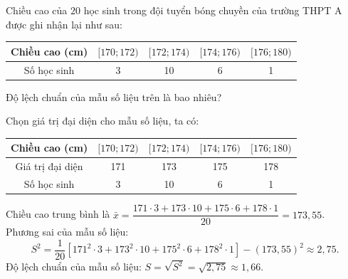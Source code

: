 \begin{bt}%

	Chiều cao của $20$ học sinh trong đội tuyển bóng chuyền của trường THPT A được ghi nhận lại như sau:
	\begin{center}
		\begin{tabular}{|c|c|c|c|c|}
			\hline Chiều cao (cm) &{$[170; 172)$} &{$[172; 174)$} &{$[174; 176)$} &{$[176; 180)$} \\
			\hline Số học sinh & 3 & 10 & 6 & 1 \\
			\hline
		\end{tabular}
	\end{center}
	Độ lệch chuẩn của mẫu số liệu trên là bao nhiêu?
	\loigiai
	{
		Chọn giá trị đại diện cho mẫu số liệu, ta có:
		\begin{center}
			\begin{tabular}{|c|c|c|c|c|}
				\hline Chiều cao (cm)  &{$[170; 172)$} &{$[172; 174)$} &{$[174; 176)$} &{$[176; 180)$} \\
				\hline Giá trị đại diện & 171 & 173 & 175 & 178 \\
				\hline Số học sinh & 3 & 10 & 6 & 1 \\
				\hline
			\end{tabular}
		\end{center} 
		Chiều cao trung bình là $\bar{x}=\dfrac{171\cdot 3+173\cdot 10+175\cdot  6+178\cdot 1 }{20}=173{,}55$.\\
		Phương sai của mẫu số liệu:
		$$
		S^2=\dfrac{1}{20}\left[171^2\cdot 3+173^2\cdot 10+175^2\cdot  6+178^2\cdot 1 \right]-\left(173{,}55\right)^2 \approx 2{,}75.
		$$
		Độ lệch chuẩn của mẫu số liệu: $S=\sqrt{S^2}=\sqrt{2{,}75} \approx 1{,}66.$	
	}
\end{bt}

